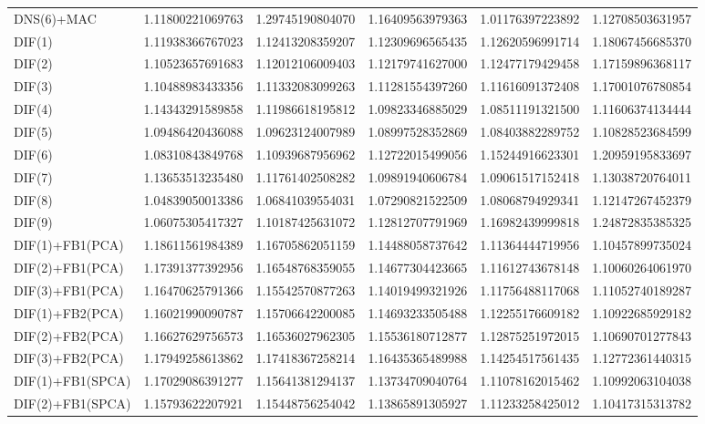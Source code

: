 \begin{table}[htb]
\begin{adjustbox}{totalheight=\baselineskip}
\begin{tabular}{lSSSSS}
DNS(6)+MAC & 1.11800221069763 & 1.29745190804070 & 1.16409563979363 & 1.01176397223892 & 1.12708503631957 \\ 
DIF(1) & 1.11938366767023 & 1.12413208359207 & 1.12309696565435 & 1.12620596991714 & 1.18067456685370 \\ 
DIF(2) & 1.10523657691683 & 1.12012106009403 & 1.12179741627000 & 1.12477179429458 & 1.17159896368117 \\ 
DIF(3) & 1.10488983433356 & 1.11332083099263 & 1.11281554397260 & 1.11616091372408 & 1.17001076780854 \\ 
DIF(4) & 1.14343291589858 & 1.11986618195812 & 1.09823346885029 & 1.08511191321500 & 1.11606374134444 \\ 
DIF(5) & 1.09486420436088 & 1.09623124007989 & 1.08997528352869 & 1.08403882289752 & 1.10828523684599 \\ 
DIF(6) & 1.08310843849768 & 1.10939687956962 & 1.12722015499056 & 1.15244916623301 & 1.20959195833697 \\ 
DIF(7) & 1.13653513235480 & 1.11761402508282 & 1.09891940606784 & 1.09061517152418 & 1.13038720764011 \\ 
DIF(8) & 1.04839050013386 & 1.06841039554031 & 1.07290821522509 & 1.08068794929341 & 1.12147267452379 \\ 
DIF(9) & 1.06075305417327 & 1.10187425631072 & 1.12812707791969 & 1.16982439999818 & 1.24872835385325 \\ 
DIF(1)+FB1(PCA) & 1.18611561984389 & 1.16705862051159 & 1.14488058737642 & 1.11364444719956 & 1.10457899735024 \\ 
DIF(2)+FB1(PCA) & 1.17391377392956 & 1.16548768359055 & 1.14677304423665 & 1.11612743678148 & 1.10060264061970 \\ 
DIF(3)+FB1(PCA) & 1.16470625791366 & 1.15542570877263 & 1.14019499321926 & 1.11756488117068 & 1.11052740189287 \\ 
DIF(1)+FB2(PCA) & 1.16021990090787 & 1.15706642200085 & 1.14693233505488 & 1.12255176609182 & 1.10922685929182 \\ 
DIF(2)+FB2(PCA) & 1.16627629756573 & 1.16536027962305 & 1.15536180712877 & 1.12875251972015 & 1.10690701277843 \\ 
DIF(3)+FB2(PCA) & 1.17949258613862 & 1.17418367258214 & 1.16435365489988 & 1.14254517561435 & 1.12772361440315 \\ 
DIF(1)+FB1(SPCA) & 1.17029086391277 & 1.15641381294137 & 1.13734709040764 & 1.11078162015462 & 1.10992063104038 \\ 
DIF(2)+FB1(SPCA) & 1.15793622207921 & 1.15448756254042 & 1.13865891305927 & 1.11233258425012 & 1.10417315313782 \\ 

\end{tabular}
\end{adjustbox}
\end{table}
